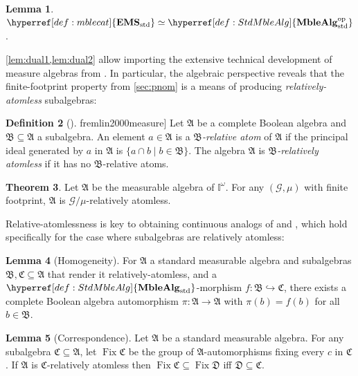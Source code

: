 \documentclass[
  sigconf,
  screen, ]{acmart}
\theoremstyle{definition}
\newtheorem{theorem}{Theorem}[section]
\newtheorem{lemma}[theorem]{Lemma}
\newtheorem{definition}[theorem]{Definition}
\newcommand\calG{\mathcal G}
\newcommand\frakA{\mathfrak A}
\newcommand\frakB{\mathfrak B}
\newcommand\frakC{\mathfrak C}
\newcommand\frakD{\mathfrak D}
\newcommand\fremlinft[3]{\citet[\href{https://www1.essex.ac.uk/maths/people/fremlin/chap#2.pdf\#page=#3}{#1}]{fremlin2000measure}}
\newcommand\nref[2]{\hyperref[#1]{#2}} \newcommand\checkhigh{{\huge{\color{red}\textbf{TODO: check}}}}
\newcommand\op{^{\rm op}}
\newcommand\texhcube{{{{\mathbb I}^\omega}}}
\newcommand\hcube{{\nref{def:hcube}{\texhcube}}}
\newcommand\texStdMble{\mathbf{EMS}_{\rm std}}
\newcommand\StdMble{{\nref{def:mblecat}{\texStdMble}}}
\newcommand\StdMbleAlg{{\nref{def:StdMbleAlg}{\mathbf{MbleAlg}_{\rm std}}}}
\newcommand\StdMbleAlgop{{\nref{def:StdMbleAlg}{\mathbf{MbleAlg}_{\rm std}\op}}}
\newcommand\Fix{\operatorname{Fix}}
\begin{document}
\begin{lemma}  \label{lem:dual2}
  $\StdMble\simeq \StdMbleAlgop$. \end{lemma}

\cref{lem:dual1,lem:dual2}
allow importing the extensive technical development
of measure algebras 
from \citet{fremlin2000measure}.
In particular, the algebraic perspective reveals
that the finite-footprint property from \cref{sec:pnom}
is a means of producing \emph{relatively-atomless} subalgebras:

\begin{definition}[\fremlinft{331A}{33}{1}]
  Let $\frakA$ be a complete Boolean algebra
  and $\frakB\subseteq\frakA$ a subalgebra.
  An element $a\in\frakA$ is a \emph{$\frakB$-relative atom}
  of $\frakA$ if the principal ideal generated by $a$ in $\frakA$
  is $\{a\cap b \mid b\in\frakB\}$. The algebra $\frakA$ is \emph{$\frakB$-relatively atomless}
  if it has no $\frakB$-relative atoms.
\end{definition}

\begin{theorem} \label{thm:relatively-atomless-enough-room}
  Let $\frakA$ be the measurable algebra
  of $\hcube$.
  For any $(\calG,\mu)$ with finite footprint,
  $\frakA$ is $\calG/\mu$-relatively atomless.
\end{theorem}

Relative-atomlessness is
key to obtaining continuous analogs of
\Homogeneity{} and \Correspondence{},
which hold 
specifically for the
case where subalgebras are relatively atomless:

\begin{lemma}[Homogeneity] \label{lem:mble-homogeneity}
  For $\frakA$ a standard measurable algebra
  and subalgebras $\frakB,\frakC\subseteq\frakA$
  that render it relatively-atomless, and 
  a $\StdMbleAlg$-morphism
   $f : \frakB\hookrightarrow\frakC$,
  there exists a complete Boolean algebra automorphism $\pi : \frakA\to\frakA$
  with $\pi(b) = f(b)$ for all $b\in\frakB$.
\end{lemma}

\begin{lemma}[Correspondence] \label{lem:mble-distinguishability}
  Let $\frakA$ be a standard measurable algebra.
  For any subalgebra $\frakC\subseteq\frakA$, 
  let $\Fix\frakC$ be the group
  of $\frakA$-automorphisms fixing every $c$ in $\frakC$.
  If $\frakA$ is $\frakC$-relatively atomless
  then $\Fix\frakC\subseteq\Fix\frakD$ iff
  $\frakD\subseteq\frakC$.
\end{lemma}
\end{document}
